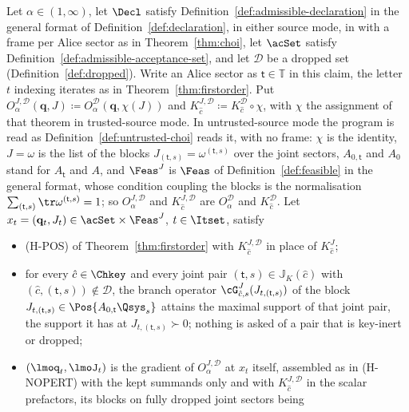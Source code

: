 \begin{corollary}
\label{cor:fo-dropped}
Let $\alpha\in(1,\infty)$, let $\Decl$ satisfy Definition~\ref{def:admissible-declaration} in
the general format of Definition~\ref{def:declaration}, in either source
mode, in  with a frame per Alice sector as in
Theorem~\ref{thm:choi}, let $\acSet$ satisfy
Definition~\ref{def:admissible-acceptance-set}, and let $\mathcal{D}$ be a dropped set
(Definition~\ref{def:dropped}). Write an Alice sector as
$\mathsf t\in\mathbb{T}$ in this claim, the letter $t$ indexing iterates as
in Theorem~\ref{thm:firstorder}. Put
$O^{J,\mathcal{D}}_{\alpha}(\mathbf q,J)\coloneqq
O^{\mathcal{D}}_{\alpha}(\mathbf q,\chi(J))$ and
$K^{J,\mathcal{D}}_{\hat c}\coloneqq K^{\mathcal{D}}_{\hat c}\circ\chi$, with
$\chi$ the assignment of that theorem in trusted-source mode. In
untrusted-source mode the program is read as
Definition~\ref{def:untrusted-choi} reads it, with no frame: $\chi$ is the
identity, $J=\omega$ is the list of the blocks
$J_{(\mathsf t,s)}=\omega^{(\mathsf t,s)}$ over the joint sectors,
$A_{0,\mathsf t}$ and $A_0$ stand for $A_{\mathsf t}$ and $A$, and
$\Feas^{J}$ is $\Feas$ of
Definition~\ref{def:feasible} in the general format, whose condition
coupling the blocks is the normalisation $\sum_{(\mathsf t,s)}
\tr\omega^{(\mathsf t,s)}=1$; so $O^{J,\mathcal{D}}_{\alpha}$ and
$K^{J,\mathcal{D}}_{\hat c}$ are $O^{\mathcal{D}}_{\alpha}$ and
$K^{\mathcal{D}}_{\hat c}$. Let
$x_t=(\mathbf q_t,J_t)\in\acSet\times\Feas^{J}$, $t\in\Itset$, satisfy
\begin{itemize}[leftmargin=3.4em]
\item[(H-POS$^{\mathcal{D}}$)] (H-POS) of Theorem~\ref{thm:firstorder} with
  $K^{J,\mathcal{D}}_{\hat c}$ in place of $K^{J}_{\hat c}$;
\item[(H-SUPP$^{\mathcal{D}}$)] for every $\hat c\in\Chkey$ and every joint
  pair $(\mathsf t,s)\in\mathbb{J}_K(\hat c)$ with
  $(\hat c,(\mathsf t,s))\notin\mathcal{D}$, the branch operator
  $\cG^{J}_{\hat c,s}(J_{t,(\mathsf t,s)})$ of the block
  $J_{t,(\mathsf t,s)}\in\Pos{A_{0,\mathsf t}\Qsys_s}$ attains the maximal
  support of that joint pair, the support it has at
  $J_{t,(\mathsf t,s)}\succ0$; nothing is asked of a pair that is key-inert
  or dropped;
\item[(H-NOPERT$^{\mathcal{D}}$)] $(\lmoq_t,\lmoJ_t)$ is the gradient of
  $O^{J,\mathcal{D}}_{\alpha}$ at $x_t$ itself, assembled as in (H-NOPERT)
  with the kept summands only and with $K^{J,\mathcal{D}}_{\hat c}$ in the
  scalar prefactors, its blocks on fully dropped joint sectors being

\end{itemize}
\end{corollary}
